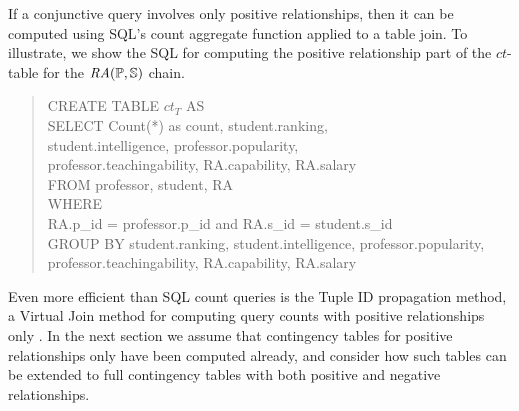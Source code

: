 \documentclass{acm_proc_article-sp}
\newcommand{\ct}{\mathit{ct}}
\begin{document}
If a conjunctive query involves only positive relationships, then it can be computed using SQL's count aggregate function applied to a table join. To illustrate, we show the SQL for computing the positive relationship part of the $\ct$-table for the $\mathit{RA}(\mathbb{P},\mathbb{S})$ chain.
%
\begin{quote}
CREATE TABLE $\ct_{T}$  AS 
\\SELECT Count(*) as  count,  student.ranking, \\student.intelligence, professor.popularity,\\ professor.teachingability, RA.capability, RA.salary  \\
FROM professor, student, RA  \\
WHERE  \\RA.p\_id = professor.p\_id and RA.s\_id = student.s\_id  \\
GROUP BY student.ranking,  student.intelligence, professor.popularity,  professor.teachingability, RA.capability,  RA.salary
\end{quote}
Even more efficient than SQL count queries is the Tuple ID propagation method, a Virtual Join method for computing query counts with positive relationships only \cite{Yin2004}. 
In the next section we assume that contingency tables for positive relationships only have been computed already, and consider how such tables can be extended to full contingency tables with both positive and negative relationships.

\end{document}
